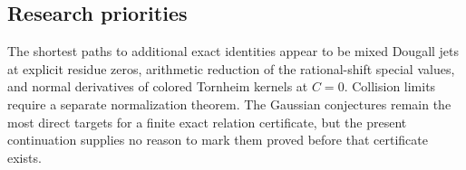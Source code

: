 \subsection{Research priorities}
The shortest paths to additional exact identities appear to be
mixed Dougall jets at explicit residue zeros, arithmetic reduction
of the rational-shift special values, and normal derivatives of
colored Tornheim kernels at $C=0$. Collision limits require a
separate normalization theorem. The Gaussian conjectures remain
the most direct targets for a finite exact relation certificate,
but the present continuation supplies no reason to mark them
proved before that certificate exists.
